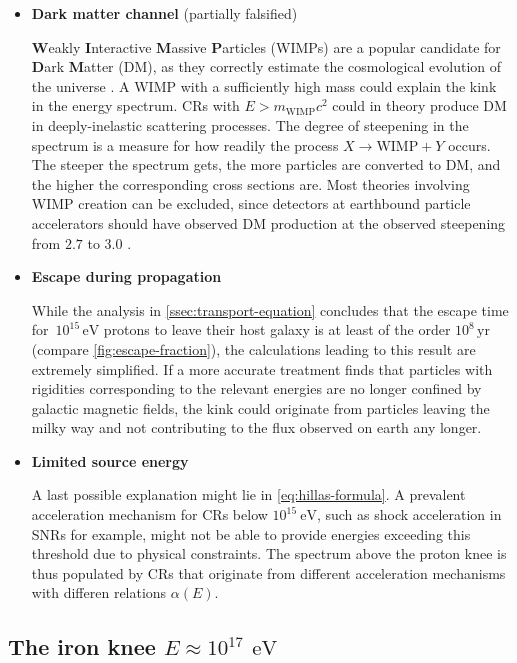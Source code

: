 \begin{itemize}
	\item \textbf{Dark matter channel} (partially falsified)

	\textbf{W}eakly \textbf{I}nteractive \textbf{M}assive \textbf{P}articles (WIMPs) are a popular candidate for \textbf{D}ark \textbf{M}atter (DM), as they 
	correctly estimate the cosmological evolution of the universe \cite{klypin1993structure}. A WIMP with a sufficiently high mass could explain the kink in the 
	energy spectrum. CRs with $E > m_\text{WIMP}c^2$ could in theory produce DM in deeply-inelastic scattering processes. The degree of steepening in the spectrum 
	is a measure for how readily the process $X \rightarrow \text{WIMP} + Y$ occurs. The steeper the spectrum gets, the more particles are converted to DM, and the
	higher the corresponding cross sections are. Most theories involving WIMP creation can be excluded, since detectors at earthbound particle accelerators should 
	have observed DM production at the observed steepening from $2.7$ to $3.0$ \cite{donato2009constraints}.

	\item \textbf{Escape during propagation}

	While the analysis in \autoref{ssec:transport-equation} concludes that the escape time for $\,10^{15}\,\text{eV}$ protons to leave their host 	galaxy is at 
	least of the order ${10^{8}}\,\text{yr}$ (compare \autoref{fig:escape-fraction}), the calculations leading to this result are extremely simplified. If a more 
	accurate treatment finds that particles with rigidities corresponding to the relevant energies are no longer confined by galactic magnetic fields, the kink 
	could originate from particles leaving the milky way and not contributing to the flux observed on earth any longer.

	\item \textbf{Limited source energy}

	A last possible explanation might lie in \autoref{eq:hillas-formula}. A prevalent acceleration mechanism for CRs below $10^{15}\SI{}{\electronvolt}$, such as 
	shock acceleration in SNRs for example, might not be able to provide energies exceeding this threshold due to physical constraints. The spectrum above the 
	proton knee is thus populated by CRs that originate from different acceleration mechanisms with differen relations $\alpha(E)$.
\end{itemize}

\subsection{The iron knee $E \approx 10^{17}\,\SI{}{\electronvolt}$}
\label{ssec:cr-iron-knee}

